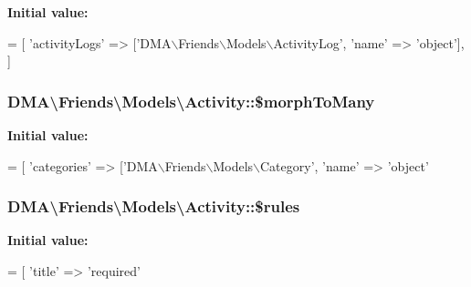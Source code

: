 {\bfseries Initial value\+:}
\begin{DoxyCode}
= [ 
        \textcolor{stringliteral}{'activityLogs'}  => [\textcolor{stringliteral}{'DMA\(\backslash\)Friends\(\backslash\)Models\(\backslash\)ActivityLog'}, \textcolor{stringliteral}{'name'} => \textcolor{stringliteral}{'object'}],
    ]
\end{DoxyCode}
\hypertarget{classDMA_1_1Friends_1_1Models_1_1Activity_a5cfb1d646716be755dcdb6ddb3ab16b1}{
\subsubsection[{\$morph\+To\+Many}]{\setlength{\rightskip}{0pt plus 5cm}D\+M\+A\textbackslash{}\+Friends\textbackslash{}\+Models\textbackslash{}\+Activity\+::\$morph\+To\+Many}}\label{classDMA_1_1Friends_1_1Models_1_1Activity_a5cfb1d646716be755dcdb6ddb3ab16b1}
{\bfseries Initial value\+:}
\begin{DoxyCode}
= [
        \textcolor{stringliteral}{'categories'}    => [\textcolor{stringliteral}{'DMA\(\backslash\)Friends\(\backslash\)Models\(\backslash\)Category'}, \textcolor{stringliteral}{'name'} => \textcolor{stringliteral}{'object'}
\end{DoxyCode}
\hypertarget{classDMA_1_1Friends_1_1Models_1_1Activity_a0b92e75aa8d92e2d3c9b24f54cd813bc}{
\subsubsection[{\$rules}]{\setlength{\rightskip}{0pt plus 5cm}D\+M\+A\textbackslash{}\+Friends\textbackslash{}\+Models\textbackslash{}\+Activity\+::\$rules}}\label{classDMA_1_1Friends_1_1Models_1_1Activity_a0b92e75aa8d92e2d3c9b24f54cd813bc}
{\bfseries Initial value\+:}
\begin{DoxyCode}
= [ 
        \textcolor{stringliteral}{'title'} => \textcolor{stringliteral}{'required'}
\end{DoxyCode}
